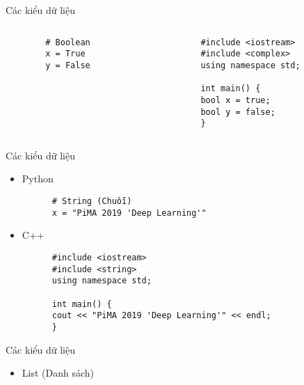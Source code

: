 \documentclass[10pt]{beamer}
\begin{document}
\begin{frame}[fragile]{Các kiểu dữ liệu}
  \begin{columns}
    \begin{column}{0.4\textwidth}
      \begin{verbatim}
        # Boolean
        x = True
        y = False
      \end{verbatim}
    \end{column}
    \begin{column}{0.7\textwidth}
      \begin{verbatim}
        #include <iostream>
        #include <complex>
        using namespace std;

        int main() {
        bool x = true;
        bool y = false;
        }
      \end{verbatim}
    \end{column}
  \end{columns}
\end{frame}

\begin{frame}[fragile]{Các kiểu dữ liệu}
  \begin{itemize}
    \item Python
    \begin{verbatim}
      # String (Chuỗi)
      x = "PiMA 2019 'Deep Learning'"
    \end{verbatim}

    \item C++
    \begin{verbatim}
      #include <iostream>
      #include <string>
      using namespace std;

      int main() {
      cout << "PiMA 2019 'Deep Learning'" << endl;
      }
    \end{verbatim}
  \end{itemize}
\end{frame}


\begin{frame}[fragile]{Các kiểu dữ liệu}

\begin{itemize}
\item List (Danh sách)

\end{itemize}
\end{frame}
\end{document}
